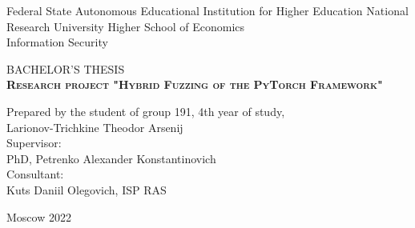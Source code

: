 \begin{titlepage}
    \newpage

    {
        \begin{center}
            Federal State Autonomous Educational Institution for Higher Education
            National Research University Higher School of Economics
            \\
            \bigskip
            Information Security \\
        \end{center}
    }

    \vspace{8em}

    \begin{center}
        {\Large BACHELOR'S THESIS}\\
        \textsc{\textbf{
                Research project
                \linebreak
                "Hybrid Fuzzing of the PyTorch Framework"}}
    \end{center}

    \vspace{4em}

    {
        \hfill\parbox{16cm}{
            \hspace*{5cm}\hspace*{-5cm}Prepared by the student of group 191, 4th year of study,\\
            Larionov-Trichkine Theodor Arsenij\\

            \hspace*{5cm}\hspace*{-5cm}Supervisor:\\
            PhD, Petrenko Alexander Konstantinovich
            \\

            \hspace*{5cm}\hspace*{-5cm}Consultant:\\
            Kuts Daniil Olegovich, ISP RAS
            \\
        }
    }

    \vspace{\fill}

    \begin{center}
        Moscow 2022
    \end{center}

\end{titlepage}
